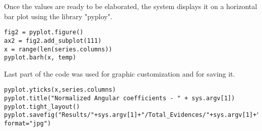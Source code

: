 Once the values are ready to be elaborated, the system displays it on a horizontal bar plot using the library "pyploy".
\begin{lstlisting}
fig2 = pyplot.figure()
ax2 = fig2.add_subplot(111)
x = range(len(series.columns))
pyplot.barh(x, temp)
\end{lstlisting}

Last part of the code was used for graphic customization and for saving it.
\begin{lstlisting}
pyplot.yticks(x,series.columns)
pyplot.title("Normalized Angular coefficients - " + sys.argv[1])
pyplot.tight_layout()
pyplot.savefig("Results/"+sys.argv[1]+"/Total_Evidences/"+sys.argv[1]+"_Norm_Ang_Coeffs.jpg", format="jpg")
\end{lstlisting}
